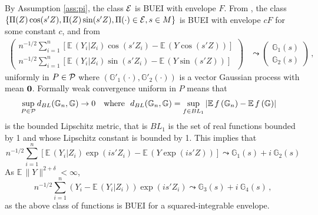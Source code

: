 \documentclass[12pt]{article}
\newcommand{\E}{\operatorname{E}}
\newcommand{\1}{\mathbf{1}}
\def\E{\mathbb{E}\,}
\newcommand{\mO}{\mbox{\bf 0}}
\begin{document}
By Assumption \ref{ass:pi}, the class ${\cal E}$ is BUEI with envelope
$F$. From \citet[Theorem 9.15]{kosorok}, the class $\left\{ \Pi (Z) \cos(s'Z),
\Pi (Z) \sin(s'Z),  \Pi (\cdot)  \in {\cal E},  s \in M \right\}$ is
BUEI with envelope $c F$ for some constant $c$, and from \citet[Lemma 2.8.3]{vaart_weak_2000}
\begin{align*}
\left(
\begin{array}{c}
  n^{-1/2} \sum_{i=1}^{n}{  \left[ \E(Y_{i}| Z_{i} )  \cos(s'Z_{i})
  - \E \left( Y \cos(s'Z) \right) \right] }
 \\
  n^{-1/2} \sum_{i=1}^{n}{ \left[ \E(Y_{i}| Z_{i} ) \sin(s'Z_{i})
    - \E \left( Y \sin(s'Z) \right) \right]}
\end{array}
\right)
 & \leadsto
 \left(
\begin{array}{c}
 \mathbb{G}_{1} (s)
 \\
 \mathbb{G}_{2} (s)
 \end{array}
\right)
\, ,
\end{align*}
uniformly in $P \in {\cal P}$ where $\left( \mathbb{G}'_{1}(\cdot),
\mathbb{G}'_{2}(\cdot)\right)$  is a vector Gaussian process with mean $\mO$.
Formally weak convergence uniform in $P$ means that
\begin{align*}
\sup_{P \in {\cal P}} d_{BL}(\mathbb{G}_{n},\mathbb{G}) & \rightarrow 0
\quad \mbox{where } \ d_{BL}(\mathbb{G}_{n},\mathbb{G})  = \sup_{f \in BL_{1}}
\left| \E f\left(\mathbb{G}_{n}\right) - \E f \left( \mathbb{G}
\right) \right|
\end{align*}
is the bounded Lipschitz metric, that is $BL_{1}$ is the set of real
functions bounded by 1 and whose Lipschitz constant is bounded by 1.
This implies that
\begin{equation*}
  n^{-1/2} \sum_{i=1}^{n}{  \left[ \E(Y_{i}| Z_{i} )  \exp(i s'Z_{i})
  - \E\left(Y \exp(is'Z)\right) \right]}
\leadsto  \mathbb{G}_{1} (s) +  i \ \mathbb{G}_{2} (s)
\label{lem:eq1}
\end{equation*}
As $\E \|Y\|^{2+\delta} < \infty$,
\begin{equation}
  n^{-1/2} \sum_{i=1}^{n}{ \left( Y_{i} - \E(Y_{i}| Z_{i} )\right)
 \exp(i s'Z_{i})}
\leadsto  \mathbb{G}_{3} (s) +  i \  \mathbb{G}_{4} (s)
\, ,
\label{lem:eq2}
\end{equation}
as the above class of functions is BUEI for a squared-integrable envelope.
\end{document}

